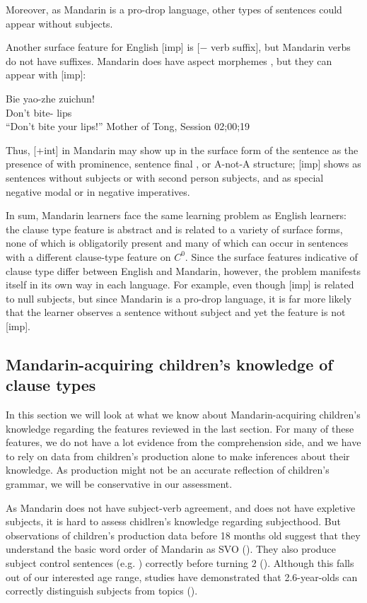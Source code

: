 Moreover, as Mandarin is a pro-drop language, other types of sentences could appear without subjects. 

Another surface feature for English [imp] is [$-$ verb suffix], but Mandarin verbs do not have suffixes. Mandarin does have aspect morphemes , but they can appear with [imp]:  

\bex{}
Bie yao-zhe zuichun!\\
Don't bite-\Asp{} lips\\
``Don't bite your lips!'' \hfill Mother of Tong, Session 02;00;19
\eex

Thus, [+int] in Mandarin may show up in the surface form of the sentence as the presence of \twh{} with prominence, sentence final , or A-not-A structure; [imp] shows as sentences without subjects or with second person subjects, and as special negative modal  or  in negative imperatives. 




In sum, Mandarin learners face the same learning problem as English learners: the clause type feature is abstract and is related to a variety of surface forms, none of which is obligatorily present and many of which can occur in sentences with a different clause-type feature on $C^{0}$. Since the surface features indicative of clause type differ between English and Mandarin, however, the problem manifests itself in its own way in each language. For example, even though [imp] is related to null subjects, but since Mandarin is a pro-drop language, it is far more likely that the learner observes a sentence without subject and yet the feature is not [imp].  

\subsection{Mandarin-acquiring children's knowledge of clause types}
\label{sec:mancl:bg:child}
In this section we will look at what we know about Mandarin-acquiring children's knowledge regarding the features reviewed in the last section. For many of these features, we do not have a lot evidence from the comprehension side, and we have to rely on data from children's production alone to make inferences about their knowledge. As production might not be an accurate reflection of children's grammar, we will be conservative in our assessment.   

   As Mandarin does not have subject-verb agreement, and does not have expletive subjects, it is hard to assess chidlren's knowledge regarding subjecthood. But observations of children's production data before 18 months old suggest that they understand the basic word order of Mandarin as SVO (\cite{tardif1993verb,tardif1996verb}). They also produce subject control sentences (e.g. ) correctly before turning 2 (\cite{yang2015control}). Although this falls out of our interested age range, studies have demonstrated that 2.6-year-olds can correctly distinguish subjects from topics (\cite{chien1985subj}). 

